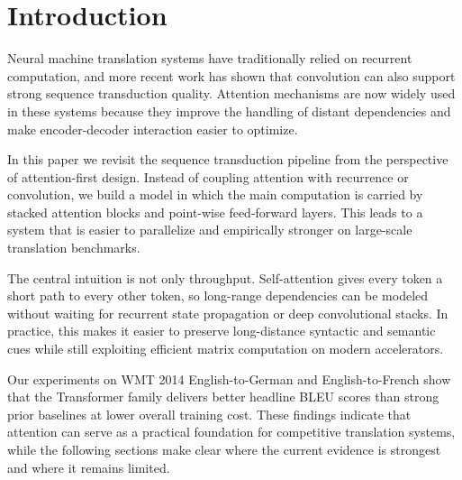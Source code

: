 \section{Introduction}

Neural machine translation systems have traditionally relied on recurrent computation, and more recent work has shown that convolution can also support strong sequence transduction quality. Attention mechanisms are now widely used in these systems because they improve the handling of distant dependencies and make encoder-decoder interaction easier to optimize.

In this paper we revisit the sequence transduction pipeline from the perspective of attention-first design. Instead of coupling attention with recurrence or convolution, we build a model in which the main computation is carried by stacked attention blocks and point-wise feed-forward layers. This leads to a system that is easier to parallelize and empirically stronger on large-scale translation benchmarks.

The central intuition is not only throughput. Self-attention gives every token a short path to every other token, so long-range dependencies can be modeled without waiting for recurrent state propagation or deep convolutional stacks. In practice, this makes it easier to preserve long-distance syntactic and semantic cues while still exploiting efficient matrix computation on modern accelerators.

Our experiments on WMT 2014 English-to-German and English-to-French show that the Transformer family delivers better headline BLEU scores than strong prior baselines at lower overall training cost. These findings indicate that attention can serve as a practical foundation for competitive translation systems, while the following sections make clear where the current evidence is strongest and where it remains limited.

